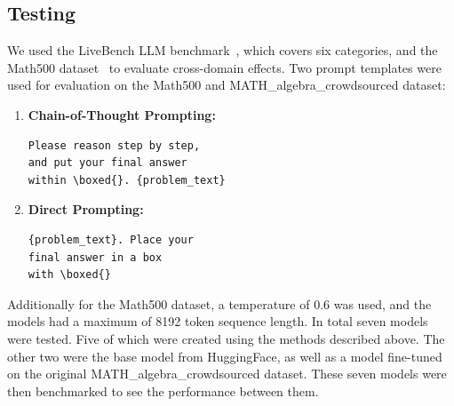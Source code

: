 \documentclass[10.5pt]{article}
\begin{document}
\subsection{Testing}
We used the LiveBench LLM benchmark~\cite{livebench}, which covers six categories, and the Math500 dataset~\cite{lightman2023lets} to evaluate cross-domain effects. Two prompt templates were used for evaluation on the Math500 and MATH\_algebra\_crowdsourced dataset:
\begin{enumerate}
    \item \textbf{Chain-of-Thought Prompting:}
    \begin{verbatim}
Please reason step by step, 
and put your final answer 
within \boxed{}. {problem_text}
    \end{verbatim}
    \item \textbf{Direct Prompting:}
    \begin{verbatim}
{problem_text}. Place your 
final answer in a box 
with \boxed{}
    \end{verbatim}
\end{enumerate}
Additionally for the Math500 dataset, a temperature of 0.6 was used, and the models had a maximum of 8192 token sequence length. In total seven models were tested. Five of which were created using the methods described above. The other two were the base model from HuggingFace, as well as a model fine-tuned on the original MATH\_algebra\_crowdsourced dataset. These seven models were then benchmarked to see the performance between them.
\end{document}

